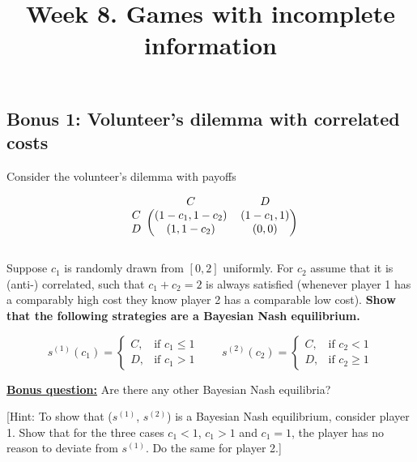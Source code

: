 \documentclass[10pt]{article}
\title{\textbf{Week 8.} Games with incomplete information}
\date{}
\begin{document}
\maketitle


\subsection*{Bonus 1: Volunteer's dilemma with correlated costs}

Consider the volunteer's dilemma with payoffs

\begin{equation*}
    \begin{blockarray}{ccc}
        & C & D \\
        \begin{block}{c(cc)}
            C & (1 - c_1, 1 - c_2) & (1 - c_1, 1) \\
            D & (1, 1 - c_2) & (0, 0) \\
        \end{block}
    \end{blockarray}
\end{equation*}

Suppose \(c_1\) is randomly drawn from \([0, 2]\) uniformly. For \(c_2\) assume
that it is (anti-) correlated, such that \(c_1 + c_2 = 2\) is always satisfied
(whenever player 1 has a comparably high cost they know player 2 has a
comparable low cost). \textbf{Show that the following strategies are a Bayesian Nash
equilibrium.}

\begin{equation*}
    s^{(1)}(c_1) = 
    \begin{cases}
        C,& \text{if } c_1 \leq 1\\
        D,              & \text{if } c_1 > 1
    \end{cases} \qquad
    s^{(2)}(c_2) = 
    \begin{cases}
        C,& \text{if } c_2 < 1\\
        D,              & \text{if } c_2 \geq 1
    \end{cases}
\end{equation*}

\underline{\textbf{Bonus question:}} Are there any other Bayesian Nash equilibria?

[Hint: To show that (\(s^{(1)}\), \(s^{(2)}\)) is a Bayesian Nash equilibrium,
consider player 1. Show that for the three cases $c_1 < 1$, $c_1 > 1$ and $c_1 =
1$, the player has no reason to deviate from \(s^{(1)}\). Do the same for player
2.]
\end{document}
